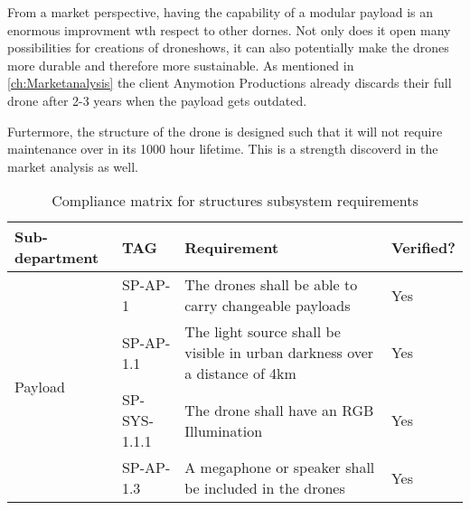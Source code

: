 From a market perspective, having the capability of a modular payload is an enormous improvment wth respect to other dornes. Not only does it open many possibilities for creations of droneshows, it can also potentially make the drones more durable and therefore more sustainable. As mentioned in \autoref{ch:Marketanalysis} the client Anymotion Productions already discards their full drone after 2-3 years when the payload gets outdated.

Furtermore, the structure of the drone is designed such that it will not require maintenance over in its 1000 hour lifetime. This is a strength discoverd in the market analysis as well.



\begin{table}[H]
\centering
\caption{Compliance matrix for structures subsystem requirements}
\label{tab:strucrequirements}
\begin{scriptsize}
\begin{tabular}{|p{1cm}|p{1.5cm}|p{10cm}|p{3cm}|}
\hline
\textbf{Sub-department} & \textbf{TAG} & \textbf{Requirement} & \textbf{Verified?}\\ \hline
\multirow{4}{*}{Payload} & SP-AP-1       & The drones shall be able to carry changeable payloads &\cellcolor[HTML]{C1FFC1}Yes\\ \cline{2-4}                                                                       
                          & SP-AP-1.1     & The light source shall be visible in urban darkness over a distance of 4km &  \cellcolor[HTML]{C1FFC1}Yes    \\ \cline{2-4}                                               
                          & SP-SYS-1.1.1 & The drone shall have an RGB Illumination &   \cellcolor[HTML]{C1FFC1}Yes \\ \cline{2-4}   
                          & SP-AP-1.3     & A megaphone or speaker shall be included in the drones &\cellcolor[HTML]{C1FFC1}Yes                                                                      \\\hline
                          

\end{tabular}
\end{scriptsize}
\end{table}
